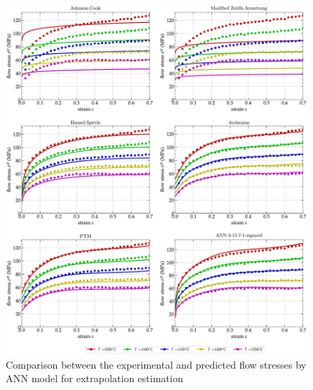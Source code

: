 \documentclass[twoside,english,1p,final,sort&compress]{elsarticle}
\theoremstyle{plain}
\begin{document}
\begin{figure}[!ht]
\centering
\includegraphics[width=0.91\columnwidth]
{Figures/CompExt}
\caption{Comparison between the experimental and predicted flow stresses by ANN model for extrapolation estimation}
\label{fig:ExtComp}
\end{figure}

\end{document}
